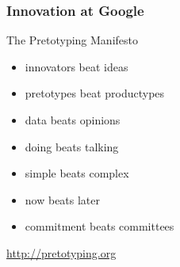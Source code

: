 \begin{frame}
\frametitle{Innovation at Google}

The Pretotyping Manifesto

\begin{itemize}
    \item innovators beat ideas 
    \item pretotypes beat productypes 
    \item data beats opinions 
    \item doing beats talking 
    \item simple beats complex 
    \item now beats later 
    \item commitment beats committees
\end{itemize}

\url{http://pretotyping.org}


\end{frame}
